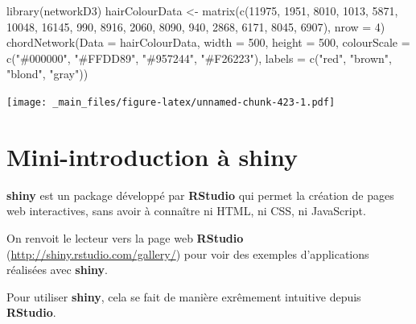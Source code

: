 \documentclass[
]{book}
\newenvironment{Shaded}{\begin{snugshade}}{\end{snugshade}}
\newcommand{\AttributeTok}[1]{\textcolor[rgb]{0.77,0.63,0.00}{#1}}
\newcommand{\DecValTok}[1]{\textcolor[rgb]{0.00,0.00,0.81}{#1}}
\newcommand{\FunctionTok}[1]{\textcolor[rgb]{0.00,0.00,0.00}{#1}}
\newcommand{\NormalTok}[1]{#1}
\newcommand{\OtherTok}[1]{\textcolor[rgb]{0.56,0.35,0.01}{#1}}
\newcommand{\StringTok}[1]{\textcolor[rgb]{0.31,0.60,0.02}{#1}}
\theoremstyle{definition}
\theoremstyle{definition}
\theoremstyle{definition}
\theoremstyle{definition}
\theoremstyle{remark}
\begin{document}
\begin{Shaded}
\begin{Highlighting}[]
\FunctionTok{library}\NormalTok{(networkD3)}
\NormalTok{hairColourData }\OtherTok{\textless{}{-}} \FunctionTok{matrix}\NormalTok{(}\FunctionTok{c}\NormalTok{(}\DecValTok{11975}\NormalTok{, }\DecValTok{1951}\NormalTok{, }\DecValTok{8010}\NormalTok{, }\DecValTok{1013}\NormalTok{, }\DecValTok{5871}\NormalTok{, }\DecValTok{10048}\NormalTok{, }\DecValTok{16145}\NormalTok{, }\DecValTok{990}\NormalTok{,}
                           \DecValTok{8916}\NormalTok{, }\DecValTok{2060}\NormalTok{, }\DecValTok{8090}\NormalTok{, }\DecValTok{940}\NormalTok{, }\DecValTok{2868}\NormalTok{, }\DecValTok{6171}\NormalTok{, }\DecValTok{8045}\NormalTok{, }\DecValTok{6907}\NormalTok{),}
                         \AttributeTok{nrow =} \DecValTok{4}\NormalTok{)}
\FunctionTok{chordNetwork}\NormalTok{(}\AttributeTok{Data =}\NormalTok{ hairColourData, }\AttributeTok{width =} \DecValTok{500}\NormalTok{, }\AttributeTok{height =} \DecValTok{500}\NormalTok{,}
             \AttributeTok{colourScale =} \FunctionTok{c}\NormalTok{(}\StringTok{"\#000000"}\NormalTok{, }\StringTok{"\#FFDD89"}\NormalTok{, }\StringTok{"\#957244"}\NormalTok{, }\StringTok{"\#F26223"}\NormalTok{),}
             \AttributeTok{labels =} \FunctionTok{c}\NormalTok{(}\StringTok{"red"}\NormalTok{, }\StringTok{"brown"}\NormalTok{, }\StringTok{"blond"}\NormalTok{, }\StringTok{"gray"}\NormalTok{))}
\end{Highlighting}
\end{Shaded}

\texttt{[image: \_main\_files/figure-latex/unnamed-chunk-423-1.pdf]}

\hypertarget{mini-introduction-uxe0-shiny}{%
\section{\texorpdfstring{Mini-introduction à \textbf{shiny}}{Mini-introduction à shiny}}\label{mini-introduction-uxe0-shiny}}

\textbf{shiny} est un package développé par \textbf{RStudio} qui permet la création de pages web interactives, sans avoir à connaître ni HTML, ni CSS, ni JavaScript.

On renvoit le lecteur vers la page web \textbf{RStudio} (\url{http://shiny.rstudio.com/gallery/}) pour voir des exemples d'applications réalisées avec \textbf{shiny}.

Pour utiliser \textbf{shiny}, cela se fait de manière exrêmement intuitive depuis \textbf{RStudio}.
\end{document}
